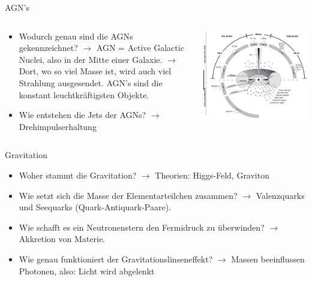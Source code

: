 \begin{frame}{AGN's}
  \begin{columns}[T, onlytextwidth]
    \begin{column}{0.47\textwidth}
\begin{itemize}
  \setlength\itemsep{2em}
  \item Wodurch genau sind die AGNs gekennzeichnet?
  $\longrightarrow$ AGN = Active Galactic Nuclei, also in der Mitte einer Galaxie.
  $\longrightarrow$ Dort, wo so viel Masse ist, wird auch viel Strahlung
  ausgesendet. AGN's sind die konstant leuchtkräftigsten Objekte.
  \item Wie entstehen die Jets der AGNs?
  $\longrightarrow$ Drehimpulserhaltung
\end{itemize}
\end{column}
\hfill
\begin{column}{0.47\textwidth}
\includegraphics[width=\textwidth]{images/Frage4.PNG}
\end{column}
\end{columns}
\end{frame}

\begin{frame}{Gravitation}
\begin{itemize}
  \setlength\itemsep{2em}
  \item Woher stammt die Gravitation?
  $\longrightarrow$ Theorien: Higgs-Feld, Graviton
  \item Wie setzt sich die Masse der Elementarteilchen zusammen?
  $\longrightarrow$ Valenzquarks und Seequarks (Quark-Antiquark-Paare).
  \item Wie schafft es ein Neutronenstern den Fermidruck zu überwinden?
  $\longrightarrow$ Akkretion von Materie.
  \item Wie genau funktioniert der Gravitationslinseneffekt?
  $\longrightarrow$ Massen beeinflussen Photonen, also: Licht wird abgelenkt
\end{itemize}
\end{frame}

